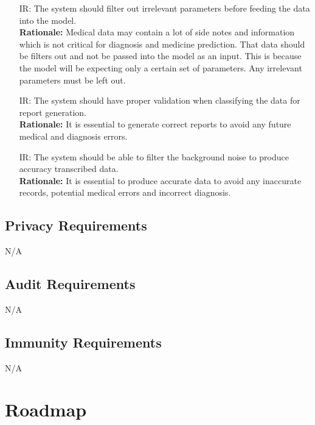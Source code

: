 \documentclass{article}
\newcounter{irnum} %
\begin{document}
\begin{itemize}
    \item [IR\refstepcounter{irnum}\theirnum \label{IR_InputCheck}:] The system should filter out irrelevant parameters before feeding the data into the model. \\
    \textbf{Rationale:} Medical data may contain a lot of side notes and information which is not critical for diagnosis and medicine prediction. That data should be filters out and not be passed into the model as an input. This is because the model will be expecting only a certain set of parameters. Any irrelevant parameters must be left out. 

    \item [IR\refstepcounter{irnum}\theirnum \label{IR_CompilingVerification}:] The system should have proper validation when classifying the data for report generation.\\
    \textbf{Rationale:} It is essential to generate correct reports to avoid any future medical and diagnosis errors.

    \item [IR\refstepcounter{irnum}\theirnum \label{IR_BackNoiseFilter}:] The system should be able to filter the background noise to produce accuracy transcribed data.\\
    \textbf{Rationale:} It is essential to produce accurate data to avoid any inaccurate records, potential medical errors and incorrect diagnosis. 

\end{itemize}

\subsection{Privacy Requirements}
N/A

\subsection{Audit Requirements}
N/A

\subsection{Immunity Requirements}
N/A

\section{Roadmap}

\end{document}

